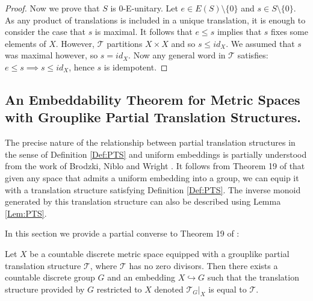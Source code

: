 \begin{corollary}
\begin{proof}
Now we prove that $S$ is $0$-E-unitary. Let $e\in E(S)\setminus \lbrace 0 \rbrace$ and $s\in S\setminus \lbrace 0 \rbrace$. As any product of translations is included in a unique translation, it is enough to consider the case that $s$ is maximal. It follows that $e \leq s$ implies that $s$ fixes some elements of $X$. However, $\mathcal{T}$ partitions $X \times X$ and so $s \leq id_{X}$. We assumed that $s$ was maximal however, so $s = id_{X}$. Now any general word in $\mathcal{T}$ satisfies: $e \leq s \implies s \leq id_{X}$, hence $s$ is idempotent.  
\end{proof}

\subsection{An Embeddability Theorem for Metric Spaces with Grouplike Partial Translation Structures.}

The precise nature of the relationship between partial translation structures in the sense of Definition \ref{Def:PTS} and uniform embeddings is partially understood from the work of Brodzki, Niblo and Wright \cite{MR2363428}. It follows from Theorem 19 of \cite{MR2363428} that given any space that admits a uniform embedding into a group, we can equip it with a translation structure satisfying Definition \ref{Def:PTS}. The inverse monoid generated by this translation structure can also be described using Lemma \ref{Lem:PTS}.

In this section we provide a partial converse to Theorem 19 of \cite{MR2363428}:

\begin{theorem}\label{thm:T2}
Let $X$ be a countable discrete metric space equipped with a grouplike partial translation structure $\mathcal{T}$, where $\mathcal{T}$ has no zero divisors. Then there exists a countable discrete group $G$ and an embedding $X \hookrightarrow G$ such that the translation structure provided by $G$ restricted to $X$ denoted $\mathcal{T}_{G}|_{X}$ is equal to $\mathcal{T}$.
\end{theorem}


\end{corollary}
